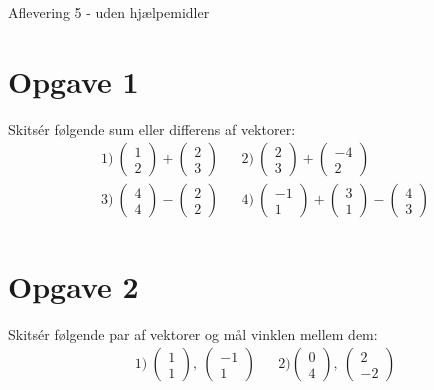 \begin{center}
\Huge
Aflevering 5 - uden hjælpemidler
\end{center}

\section*{Opgave 1}
Skitsér følgende sum eller differens af vektorer:
\begin{align*}
&1) \ \begin{pmatrix}1\\ 2\end{pmatrix} + \begin{pmatrix}2 \\ 3\end{pmatrix} &&2) \ \begin{pmatrix}2 \\ 3\end{pmatrix} + \begin{pmatrix}-4 \\ 2\end{pmatrix}  \\
&3) \ \begin{pmatrix} 4 \\ 4\end{pmatrix} - \begin{pmatrix} 2 \\ 2\end{pmatrix}&&4) \  \begin{pmatrix} -1 \\ 1\end{pmatrix} + \begin{pmatrix} 3 \\ 1\end{pmatrix} - \begin{pmatrix} 4 \\ 3 \end{pmatrix}\\
\end{align*}

\section*{Opgave 2}
Skitsér følgende par af vektorer og mål vinklen mellem dem:
\begin{align*}
&1) \ \begin{pmatrix} 1\\1\end{pmatrix},\ \begin{pmatrix}-1\\1 \end{pmatrix}  &&2) \begin{pmatrix}0\\ 4\end{pmatrix},\ \begin{pmatrix}2 \\ -2\end{pmatrix}
\end{align*}


